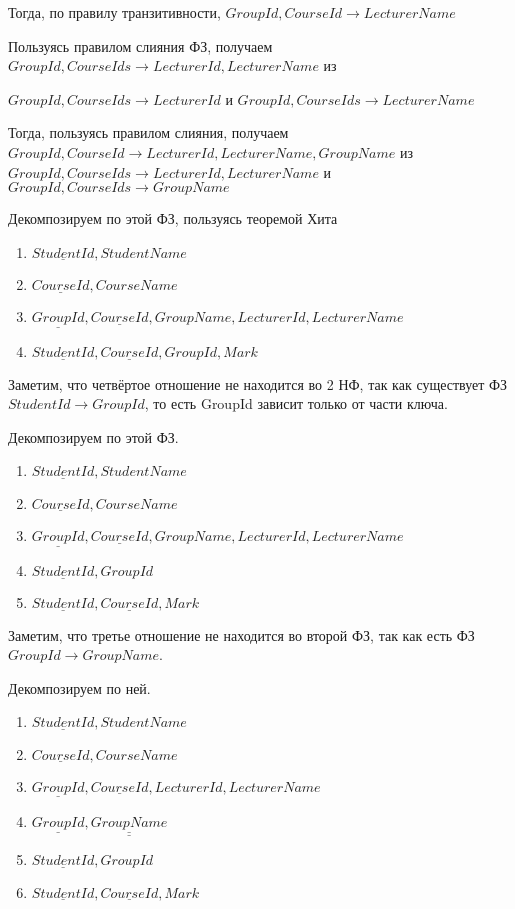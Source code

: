 \documentclass{article}
\begin{document}
	Тогда, по правилу транзитивности, $GroupId, CourseId \rightarrow LecturerName$
	
	Пользуясь правилом слияния ФЗ, получаем $GroupId, CourseIds\rightarrow LecturerId,  LecturerName$ из 
	
	$GroupId, CourseIds \rightarrow LecturerId$ и $GroupId, CourseIds \rightarrow LecturerName$
	
	Тогда, пользуясь правилом слияния,  получаем $GroupId, CourseId \rightarrow LecturerId,  LecturerName, GroupName$ из $GroupId, CourseIds\rightarrow LecturerId,  LecturerName$  и $GroupId, CourseIds\rightarrow GroupName$ 
	
	Декомпозируем по этой ФЗ, пользуясь теоремой Хита
	
	\begin{enumerate}
		\item $\underline{StudentId}, StudentName$
		\item $\underline{CourseId}, CourseName$
		\item $\underline{GroupId}, \underline{CourseId}, GroupName, LecturerId, LecturerName$
		\item $\underline{StudentId}, \underline{CourseId}, GroupId, Mark$
	\end{enumerate}

	Заметим, что четвёртое отношение не находится во 2 НФ, так как существует ФЗ $StudentId \rightarrow GroupId$, то есть GroupId зависит только от части ключа.
	
	Декомпозируем по этой ФЗ.
	
	\begin{enumerate}
		\item $\underline{StudentId}, StudentName$
		\item $\underline{CourseId}, CourseName$
		\item $\underline{GroupId}, \underline{CourseId}, GroupName, LecturerId, LecturerName$
		\item $\underline{StudentId}, GroupId$
		\item $\underline{StudentId}, \underline{CourseId}, Mark$
	\end{enumerate}
	
	Заметим, что третье отношение не находится во второй ФЗ, так как есть ФЗ $GroupId \rightarrow GroupName$.
	
	Декомпозируем по ней.
	
	\begin{enumerate}
		\item $\underline{StudentId}, StudentName$
		\item $\underline{CourseId}, CourseName$
		\item $\underline{GroupId}, \underline{CourseId}, LecturerId, LecturerName$
		\item $\underline{GroupId}, \underline{\underline{GroupName}}$
		\item $\underline{StudentId}, GroupId$
		\item $\underline{StudentId}, \underline{CourseId}, Mark$
	\end{enumerate}
\end{document}
